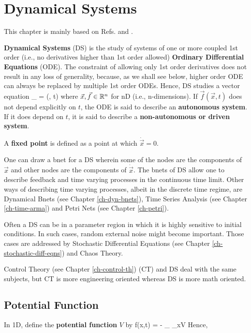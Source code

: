 \chapter{Dynamical Systems}
\label{ch-dynamical-sys}

This chapter is mainly based on 
Refs.\cite{dynamical-fuchs} and \cite{wiki-phase-plane}.

{\bf Dynamical Systems} (DS)
is the study of systems of one or more
coupled 1st order (i.e., no derivatives higher than 1st order allowed) {\bf Ordinary Differential Equations} (ODE).
The constraint of allowing only 1st order
derivatives does not result in any loss of generality,
because, as we shall see below, higher order ODE
can always be replaced by multiple 1st order ODEs.
Hence, DS studies a vector equation
\beq
{}_{}
= (, t)
\eeq
where $\vec{x},  \vec{f}\in{ \mathbb{R}}^n$ for nD (i.e., n-dimensions).
If $\vec{f}(\vec{x},t)$ does not
depend explicitly on $t$, 
the ODE is said
to describe an {\bf autonomous
system}.
If it does depend on $t$,
it is said to describe a
{\bf non-autonomous or driven
system}.

A {\bf fixed point} is defined as a point
at which $\dot{\vec{x}}=0$.

One can draw a bnet for a DS wherein some
of the nodes are the components of $\vec{x}$
and other nodes are the components of $\dot{\vec{x}}$.
The bnets of DS allow one to describe feedback and time
varying processes in the continuous time limit.
Other ways of describing time varying processes, albeit in the
discrete time regime, are Dynamical Bnets (see Chapter \ref{ch-dyn-bnets}),
Time Series Analysis (see Chapter \ref{ch-time-arma})
and Petri Nets (see Chapter \ref{ch-petri}).


Often a DS can be in a parameter region
in which it is highly sensitive to initial conditions. In such cases, random external noise 
might become important. Those cases are 
addressed by Stochastic Differential Equations (see Chapter
\ref{ch-stochastic-diff-eqns})
and Chaos Theory.

Control Theory (see Chapter \ref{ch-control-th}) (CT)
and DS deal with the same subjects, but CT is more
engineering oriented whereas DS is more math oriented.
\section{Potential Function}

In 1D, define the {\bf potential function} $V$ by
\beq
f(x,t) = -
_{ \partial_xV}
\eeq
Hence,


